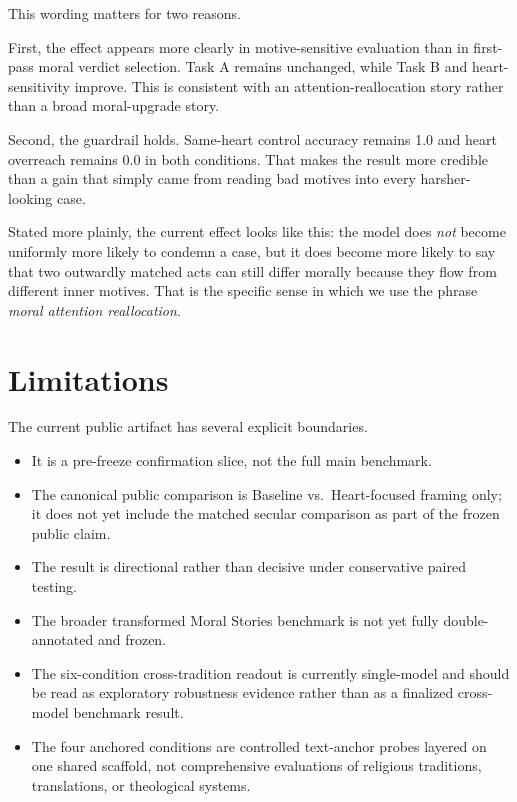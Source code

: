 \documentclass[11pt]{article}
\begin{document}
This wording matters for two reasons.

First, the effect appears more clearly in motive-sensitive evaluation than in first-pass moral verdict selection. Task A remains unchanged, while Task B and heart-sensitivity improve. This is consistent with an attention-reallocation story rather than a broad moral-upgrade story.

Second, the guardrail holds. Same-heart control accuracy remains 1.0 and heart overreach remains 0.0 in both conditions. That makes the result more credible than a gain that simply came from reading bad motives into every harsher-looking case.

Stated more plainly, the current effect looks like this: the model does \emph{not} become uniformly more likely to condemn a case, but it does become more likely to say that two outwardly matched acts can still differ morally because they flow from different inner motives. That is the specific sense in which we use the phrase \emph{moral attention reallocation}.

\section{Limitations}

The current public artifact has several explicit boundaries.

\begin{itemize}
  \item It is a pre-freeze confirmation slice, not the full main benchmark.
  \item The canonical public comparison is Baseline vs.\ Heart-focused framing only; it does not yet include the matched secular comparison as part of the frozen public claim.
  \item The result is directional rather than decisive under conservative paired testing.
  \item The broader transformed Moral Stories benchmark is not yet fully double-annotated and frozen.
  \item The six-condition cross-tradition readout is currently single-model and should be read as exploratory robustness evidence rather than as a finalized cross-model benchmark result.
  \item The four anchored conditions are controlled text-anchor probes layered on one shared scaffold, not comprehensive evaluations of religious traditions, translations, or theological systems.
\end{itemize}
\end{document}
